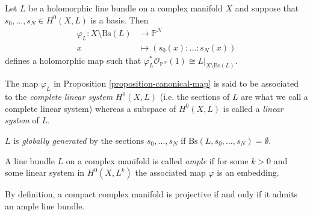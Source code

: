\begin{proposition}
\label{proposition-canonical-map}
\begin{reference}
\cite[Proposition 2.3.26]{huc}
\end{reference}
Let $L$ be a holomorphic line bundle on a complex manifold $X$ and suppose that
$s_0,\ldots,s_N\in H^{0}(X,L)$ is a basis. Then
\begin{align*}
\varphi_L: X\setminus\text{Bs}(L) &\longrightarrow \mathbb{P}^N \\
x &\longmapsto (s_0(x):\ldots:s_N(x))
\end{align*}
defines a holomorphic map such that $\varphi^*
_L\mathcal{O}_{\mathbb{P}^N}(1)\cong L|_{X\setminus\text{Bs}(L)}$.
\end{proposition}

\begin{definition}
\label{definition-linear-system}
\begin{reference}
\cite[p. 86]{huc}
\end{reference}
The map $\varphi_L$ in Proposition \ref{proposition-canonical-map} is said to be
associated to the {\it complete linear system} $H^{0}(X,L)$ (i.e. the sections
of $L$ are what we call a complete linear system) whereas a subspace of 
$H^{0}(X,L)$ is called a {\it linear system} of $L$.
\end{definition}

\begin{definition}
\label{definition-globally-generated}
\begin{reference}
\cite[p. 86]{huc}
\end{reference}
$L$ is {\it globally generated} by the sections $s_0,\ldots,s_N$ if
$\text{Bs}(L,s_0,\ldots,s_N)=\emptyset$.
\end{definition}

\begin{definition}
\label{definition-ample}
\begin{reference}
\cite[Definition 2.3.28]{huc}
\end{reference}
A line bundle $L$ on a complex manifold is called {\it ample} if for some $k>0$
and some linear system in $H^{0}(X,L^k)$ the associated map $\varphi$ is an
embedding.
\end{definition}

\begin{slogan}
By definition, a compact complex manifold is projective if and only if it admits
an ample line bundle.
\end{slogan}

